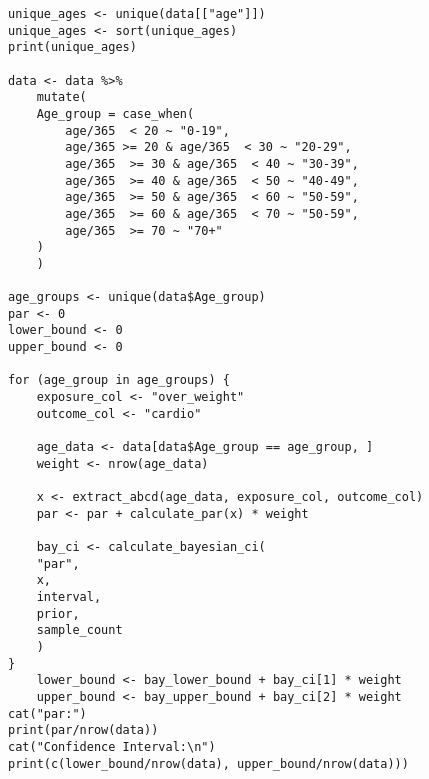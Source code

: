 \begin{lstlisting}
unique_ages <- unique(data[["age"]])
unique_ages <- sort(unique_ages)
print(unique_ages)

data <- data %>%
    mutate(
    Age_group = case_when(
        age/365  < 20 ~ "0-19",
        age/365 >= 20 & age/365  < 30 ~ "20-29",
        age/365  >= 30 & age/365  < 40 ~ "30-39",
        age/365  >= 40 & age/365  < 50 ~ "40-49",
        age/365  >= 50 & age/365  < 60 ~ "50-59",
        age/365  >= 60 & age/365  < 70 ~ "50-59",
        age/365  >= 70 ~ "70+"
    )
    )

age_groups <- unique(data$Age_group)
par <- 0
lower_bound <- 0
upper_bound <- 0

for (age_group in age_groups) {
    exposure_col <- "over_weight"
    outcome_col <- "cardio"
    
    age_data <- data[data$Age_group == age_group, ]
    weight <- nrow(age_data)
    
    x <- extract_abcd(age_data, exposure_col, outcome_col)
    par <- par + calculate_par(x) * weight
    
    bay_ci <- calculate_bayesian_ci(
    "par",
    x,
    interval,
    prior,
    sample_count
    )
}
    lower_bound <- bay_lower_bound + bay_ci[1] * weight
    upper_bound <- bay_upper_bound + bay_ci[2] * weight
cat("par:")
print(par/nrow(data))
cat("Confidence Interval:\n")
print(c(lower_bound/nrow(data), upper_bound/nrow(data)))
\end{lstlisting}
